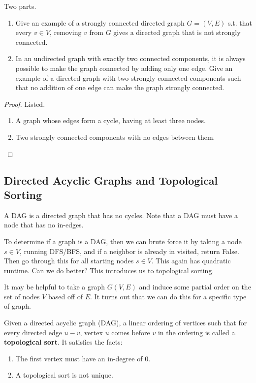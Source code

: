 \documentclass{article}
\begin{document}
    \begin{exercise}
      Two parts. 
      \begin{enumerate}
        \item Give an example of a strongly connected directed graph $G = (V, E)$ s.t. that every $v \in V$, removing $v$ from $G$ gives a directed graph that is not strongly connected. 
        \item In an undirected graph with exactly two connected components, it is always possible to make the graph connected by adding only one edge. Give an example of a directed graph with two strongly connected components such that no addition of one edge can make the graph strongly connected.
      \end{enumerate}
    \end{exercise}
    \begin{proof}
      Listed. 
      \begin{enumerate}
        \item A graph whose edges form a cycle, having at least three nodes.
        \item Two strongly connected components with no edges between them.
      \end{enumerate}
    \end{proof}
    
  \subsection{Directed Acyclic Graphs and Topological Sorting}

    \begin{definition}
      A DAG is a directed graph that has no cycles. Note that a DAG must have a node that has no in-edges. 
    \end{definition}

    To determine if a graph is a DAG, then we can brute force it by taking a node $s \in V$, running DFS/BFS, and if a neighbor is already in visited, return False. Then go through this for all starting nodes $s \in V$. This again has quadratic runtime. Can we do better? This introduces us to topological sorting. 

    It may be helpful to take a graph $G(V, E)$ and induce some partial order on the set of nodes $V$ based off of $E$. It turns out that we can do this for a specific type of graph. 
    
    \begin{definition}
      Given a directed acyclic graph (DAG), a linear ordering of vertices such that for every directed edge $u-v$, vertex $u$ comes before $v$ in the ordering is called a \textbf{topological sort}. It satisfies the facts: 
      \begin{enumerate}
        \item The first vertex must have an in-degree of $0$. 
        \item A topological sort is not unique. 
      \end{enumerate}
    \end{definition}
\end{document}
